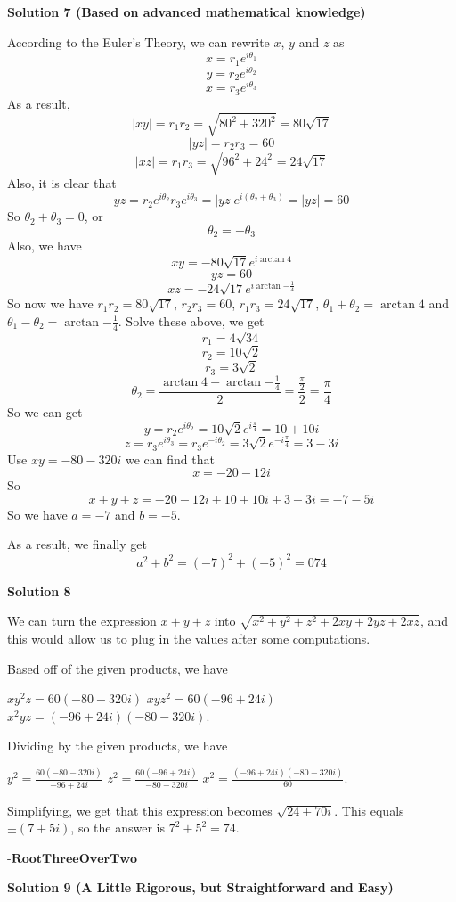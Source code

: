 \begin{enumerate}
 



\textbf{Solution 7 (Based on advanced mathematical knowledge)}

According to the Euler's Theory, we can rewrite $x$, $y$ and $z$ as 
 \[x=r_{1}e^{i{\theta}_1}\] 
 \[y=r_{2}e^{i{\theta}_2}\] 
 \[x=r_{3}e^{i{\theta}_3}\] As a result, 
 \[|xy|=r_{1}r_{2}=\sqrt{80^2+320^2}=80\sqrt{17}\] 
 \[|yz|=r_{2}r_{3}=60\] 
 \[|xz|=r_{1}r_{3}=\sqrt{96^2+24^2}=24\sqrt{17}\] Also, it is clear that 
 \[yz=r_{2}e^{i{\theta}_2}r_{3}e^{i{\theta}_3}=|yz|e^{i({\theta}_2+{\theta}_3)}=|yz|=60\] So ${\theta}_2+{\theta}_3=0$, or 
 \[{\theta}_2=-{\theta}_3\] Also, we have 
 \[xy=-80\sqrt{17}e^{i\arctan{4}}\] 
 \[yz=60\] 
 \[xz=-24\sqrt{17}e^{i\arctan{-\frac{1}{4}}}\] So now we have $r_{1}r_{2}=80\sqrt{17}$, $r_{2}r_{3}=60$, $r_{1}r_{3}=24\sqrt{17}$, ${\theta}_1+{\theta}_2=\arctan{4}$ and ${\theta}_1-{\theta}_2=\arctan {-\frac{1}{4}}$. Solve these above, we get 
 \[r_{1}=4\sqrt{34}\] 
 \[r_{2}=10\sqrt{2}\] 
 \[r_{3}=3\sqrt{2}\] 
 \[{\theta}_2=\frac{\arctan{4}-\arctan{-\frac{1}{4}}}{2}=\frac{\frac{\pi}{2}}{2}=\frac{\pi}{4}\] So we can get 
 \[y=r_{2}e^{i{\theta}_2}=10\sqrt{2}e^{i\frac{\pi}{4}}=10+10i\] 
 \[z=r_{3}e^{i{\theta}_3}=r_{3}e^{-i{\theta}_2}=3\sqrt{2}e^{-i\frac{\pi}{4}}=3-3i\] Use $xy=-80-320i$ we can find that 
 \[x=-20-12i\] So 
 \[x+y+z=-20-12i+10+10i+3-3i=-7-5i\] So we have $a=-7$ and $b=-5$.

 As a result, we finally get 
 \[a^2+b^2=(-7)^2+(-5)^2=\boxed{074}\]




\textbf{Solution 8}

We can turn the expression $x+y+z$ into $\sqrt{x^2+y^2+z^2+2xy+2yz+2xz}$, and this would allow us to plug in the values after some computations.

 Based off of the given products, we have

 $xy^2z=60(-80-320i)$
$xyz^2=60(-96+24i)$
$x^2yz=(-96+24i)(-80-320i)$.

 Dividing by the given products, we have

 $y^2=\frac{60(-80-320i)}{-96+24i}$
$z^2=\frac{60(-96+24i)}{-80-320i}$
$x^2=\frac{(-96+24i)(-80-320i)}{60}$.

 Simplifying, we get that this expression becomes $\sqrt{24+70i}$. This equals $\pm{(7+5i)}$, so the answer is $7^2+5^2=\boxed{74}$.

 $\textbf{-RootThreeOverTwo}$




\textbf{Solution 9 (A Little Rigorous, but Straightforward and Easy)}


\end{enumerate}
